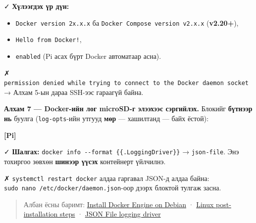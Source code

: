 ✓ \textbf{Хүлээгдэх үр дүн:}

\begin{itemize}
\tightlist
\item
  \texttt{Docker\ version\ 2x.\allowbreak{}x.\allowbreak{}x} ба \texttt{Docker\ Compose\ version\ v2.\allowbreak{}x.\allowbreak{}x} (\textbf{v2.20+}),
\item
  \texttt{Hello\ from\ Docker!},
\item
  \texttt{enabled} (Pi асах бүрт Docker автоматаар асна).
\end{itemize}

✗ \texttt{permission\ denied\ while\ trying\ to\ connect\ to\ the\ Docker\ daemon\ socket} → Алхам 5-ын дараа SSH-ээс гараагүй байна.

\textbf{Алхам 7 --- Docker-ийн лог microSD-г элээхээс сэргийлэх.} Блокийг \textbf{бүтнээр нь} буулга (\texttt{log-opts}-ийн утгууд \textbf{мөр} --- хашилтанд --- байх ёстой):

\textbf{{[}Pi{]}}

\begin{Shaded}
\begin{Highlighting}[]
\OperatorTok{\textgreater{}}
\NormalTok{\{}
\NormalTok{\}}
\end{Highlighting}
\end{Shaded}

✓ \textbf{Шалгах:} \texttt{docker\ info\ -\/-format\ \textquotesingle{}\{\{.LoggingDriver\}\}\textquotesingle{}} → \texttt{json-file}. Энэ тохиргоо зөвхөн \textbf{шинээр үүсэх} контейнерт үйлчилнэ.

✗ \texttt{systemctl\ restart\ docker} алдаа гаргавал JSON-д алдаа байна: \texttt{sudo\ nano\ /\allowbreak{}etc/\allowbreak{}docker/\allowbreak{}daemon.\allowbreak{}json}-оор дээрх блоктой тулгаж засна.

\begin{quote}
Албан ёсны баримт: \href{https://docs.docker.com/engine/install/debian/}{Install Docker Engine on Debian} · \href{https://docs.docker.com/engine/install/linux-postinstall/}{Linux post-installation steps} · \href{https://docs.docker.com/engine/logging/drivers/json-file/}{JSON File logging driver}
\end{quote}

